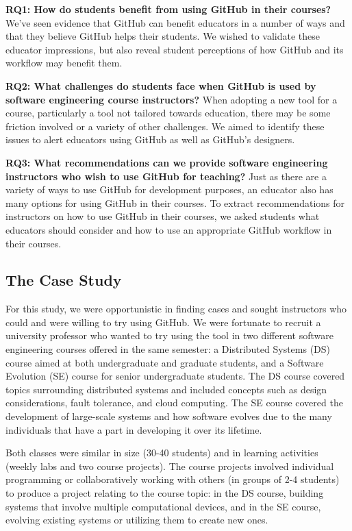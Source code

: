 \textbf{RQ1: How do students benefit from using GitHub in their courses?} We've seen evidence that GitHub can benefit educators in a number of ways \cite{zagalsky2015emergence} and that they believe GitHub helps their students. We wished to validate these educator impressions, but also reveal student perceptions of how GitHub and its workflow may benefit them.

\textbf{RQ2: What challenges do students face when GitHub is used by software engineering course instructors?} When adopting a new tool for a course, particularly a tool not tailored towards education, there may be some friction involved or a variety of other challenges. We aimed to identify these issues to alert educators using GitHub as well as GitHub's designers.

\textbf{RQ3: What recommendations can we provide software engineering instructors who wish to use GitHub for teaching?} Just as there are a variety of ways to use GitHub for development purposes, an educator also has many options for using GitHub in their courses. To extract recommendations for instructors on how to use GitHub in their courses, we asked students what educators should consider and how to use an appropriate GitHub workflow in their courses.

\subsection{The Case Study}
For this study, we were opportunistic in finding cases and sought instructors who could and were willing to try using GitHub. We were fortunate to recruit a university professor who wanted to try using the tool in two different software engineering courses offered in the same semester: a Distributed Systems (DS) course aimed at both undergraduate and graduate students, and a Software Evolution (SE) course for senior undergraduate students. The DS course covered topics surrounding distributed systems and included concepts such as design considerations, fault tolerance, and cloud computing. The SE course covered the development of large-scale systems and how software evolves due to the many individuals that have a part in developing it over its lifetime.

Both classes were similar in size (30-40 students) and in learning activities (weekly labs and two course projects). The course projects involved individual programming or collaboratively working with others (in groups of 2-4 students) to produce a project relating to the course topic: in the DS course, building systems that involve multiple computational devices, and in the SE course, evolving existing systems or utilizing them to create new ones.

